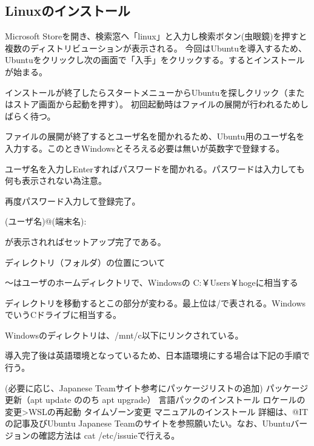 \documentclass[autodetect-engine,dvipdfmx-if-dvi,ja=standard,a4j]{bxjsarticle}
\begin{document}
		\subsection{Linuxのインストール}
			Microsoft Storeを開き、検索窓へ「linux」と入力し検索ボタン(虫眼鏡)を押すと複数のディストリビューションが表示される。
			今回はUbuntuを導入するため、Ubuntuをクリックし次の画面で「入手」をクリックする。するとインストールが始まる。\par
			インストールが終了したらスタートメニューからUbuntuを探しクリック（またはストア画面から起動を押す）。
			初回起動時はファイルの展開が行われるためしばらく待つ。\par\noindent
			ファイルの展開が終了するとユーザ名を聞かれるため、Ubuntu用のユーザ名を入力する。このときWindowsとそろえる必要は無いが英数字で登録する。\par\noindent
			ユーザ名を入力しEnterすればパスワードを聞かれる。パスワードは入力しても何も表示されない為注意。\par\noindent
			再度パスワード入力して登録完了。\par
			(ユーザ名)@(端末名):~\par
			が表示されればセットアップ完了である。\par
			ディレクトリ（フォルダ）の位置について\par
			～はユーザのホームディレクトリで、Windowsの C:￥Users￥hogeに相当する\par
			ディレクトリを移動するとこの部分が変わる。最上位は/で表される。WindowsでいうCドライブに相当する。\par
			Windowsのディレクトリは、/mnt/c以下にリンクされている。\par
			導入完了後は英語環境となっているため、日本語環境にする場合は下記の手順で行う。\par
			(必要に応じ、Japanese Teamサイト参考にパッケージリストの追加)
			パッケージ更新（apt update ののち apt upgrade）
			言語パックのインストール
			ロケールの変更>WSLの再起動
			タイムゾーン変更
			マニュアルのインストール
			詳細は、@ITの記事及びUbuntu Japanese Teamのサイトを参照願いたい。なお、Ubuntuバージョンの確認方法は cat /etc/issuieで行える。\par
\end{document}
